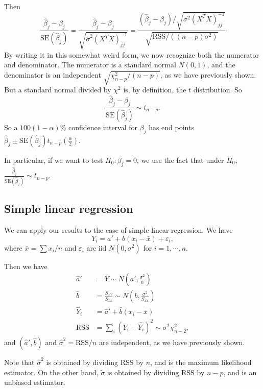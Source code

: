 \documentclass[a4paper]{article}
\begin{document}
Then
\[
  \frac{\hat{\beta}_j - \beta_j}{\mathrm{SE}(\hat{\beta}_j)} = \frac{\hat{\beta}_j - \beta_j}{\sqrt{\tilde{\sigma}^2(X^TX)^{-1}_{jj}}} = \frac{(\hat{\beta}_j - \beta_j)/\sqrt{\sigma^2(X^TX)_{jj}^{-1}}}{\sqrt{\mathrm{RSS}/((n - p)\sigma^2)}}
\]
By writing it in this somewhat weird form, we now recognize both the numerator and denominator. The numerator is a standard normal $N(0, 1)$, and the denominator is an independent $\sqrt{\chi^2_{n - p}/(n - p)}$, as we have previously shown. But a standard normal divided by $\chi^2$ is, by definition, the $t$ distribution. So
\[
  \frac{\hat{\beta}_j - \beta_j}{\mathrm{SE}(\hat{\beta}_j)} \sim t_{n - p}.
\]
So a $100(1 - \alpha)\%$ confidence interval for $\beta_j$ has end points $\hat{\beta}_j\pm \mathrm{SE}(\hat{\beta}_j)t_{n - p}(\frac{\alpha}{2})$.

In particular, if we want to test $H_0: \beta_j = 0$, we use the fact that under $H_0$, $\frac{\hat{\beta}_j}{\mathrm{SE}(\hat{\beta}_j)} \sim t_{n - p}$.

\subsection{Simple linear regression}
We can apply our results to the case of simple linear regression. We have
\[
  Y_i = a' + b(x_i - \bar x) + \varepsilon_i,
\]
where $\bar x = \sum x_i/n$ and $\varepsilon_i$ are iid $N(0, \sigma^2)$ for $i = 1, \cdots, n$.

Then we have
\begin{align*}
  \hat{a}' &= \bar Y \sim N\left(a', \frac{\sigma^2}{n}\right)\\
  \hat{b} &= \frac{S_{xY}}{S_{xx}}\sim N\left(b, \frac{\sigma^2}{S_{xx}}\right)\\
  \hat{Y}_i &= \hat{a}' + \hat{b}(x_i - \bar x)\\
  \mathrm{RSS} &= \sum_i (Y_i - \hat{Y_i})^2 \sim \sigma^2 \chi_{n - 2}^2,
\end{align*}
and $(\hat{a}', \hat{b})$ and $\hat{\sigma}^2 = \text{RSS}/n$ are independent, as we have previously shown.

Note that $\hat{\sigma}^2$ is obtained by dividing RSS by $n$, and is the maximum likelihood estimator. On the other hand, $\tilde{\sigma}$ is obtained by dividing RSS by $n - p$, and is an unbiased estimator.
\end{document}
